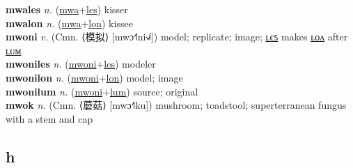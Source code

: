 \textbf{mwales} \textit{n.} (\hyperref[mwa]{mwa}+\hyperref[les]{les})
kisser \label{mwales} \\
\textbf{mwalon} \textit{n.} (\hyperref[mwa]{mwa}+\hyperref[lon]{lon})
kissee \label{mwalon} \\
\textbf{mwoni} \textit{v.} (Cmn. ⟨模拟⟩ [mwɔ˧˥ni˧˩˧])
model; replicate; image; \hyperref[mwoniles]{ʟєꜱ} makes \hyperref[mwonilon]{ʟᴏᴧ} after \hyperref[mwonilum]{ʟᴜᴍ} \label{mwoni} \\
\textbf{mwoniles} \textit{n.} (\hyperref[mwoni]{mwoni}+\hyperref[les]{les})
modeler \label{mwoniles} \\
\textbf{mwonilon} \textit{n.} (\hyperref[mwoni]{mwoni}+\hyperref[lon]{lon})
model; image \label{mwonilon} \\
\textbf{mwonilum} \textit{n.} (\hyperref[mwoni]{mwoni}+\hyperref[lum]{lum})
source; original \label{mwonilum} \\
\textbf{mwok} \textit{n.} (Cmn. ⟨蘑菇⟩ [mwɔ˧˥ku])
mushroom; toadstool; superterranean fungus with a stem and cap \label{mwok} \\
\subsection{h}

